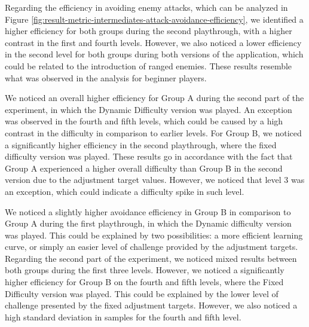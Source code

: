 Regarding the efficiency in avoiding enemy attacks, which can be analyzed in Figure \ref{fig:result-metric-intermediates-attack-avoidance-efficiency}, we identified a higher efficiency for both groups during the second playthrough, with a higher contrast in the first and fourth levels. However, we also noticed a lower efficiency in the second level for both groups during both versions of the application, which could be related to the introduction of ranged enemies. These results resemble what was observed in the analysis for beginner players.

We noticed an overall higher efficiency for Group A during the second part of the experiment, in which the Dynamic Difficulty version was played. An exception was observed in the fourth and fifth levels, which could be caused by a high contrast in the difficulty in comparison to earlier levels. For Group B, we noticed a significantly higher efficiency in the second playthrough, where the fixed difficulty version was played. These results go in accordance with the fact that Group A experienced a higher overall difficulty than Group B in the second version due to the adjustment target values. However, we noticed that level 3 was an exception, which could indicate a difficulty spike in such level.

We noticed a slightly higher avoidance efficiency in Group B in comparison to Group A during the first playthrough, in which the Dynamic difficulty version was played. This could be explained by two possibilities: a more efficient learning curve, or simply an easier level of challenge provided by the adjustment targets. Regarding the second part of the experiment, we noticed mixed results between both groups during the first three levels. However, we noticed a significantly higher efficiency for Group B on the fourth and fifth levels, where the Fixed Difficulty version was played. This could be explained by the lower level of challenge presented by the fixed adjustment targets. However, we also noticed a high standard deviation in samples for the fourth and fifth level.

